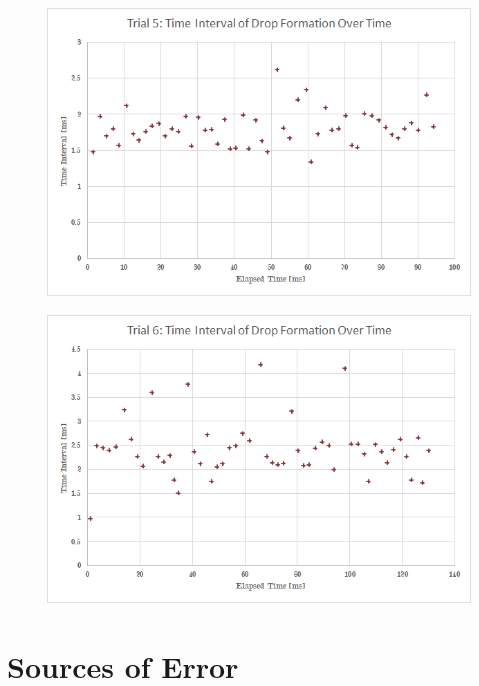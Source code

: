 \documentclass[a4paper]{article}
\begin{document}
\begin{figure}[H]
\centering
\begin{minipage}{.5\textwidth}
  \centering
  \includegraphics[width=\linewidth]{sink5.png}
  \label{fig:test1}
\end{minipage}%
\begin{minipage}{.5\textwidth}
  \centering
  \includegraphics[width=\linewidth]{sink6.png}
  \label{fig:test2}
\end{minipage}
\end{figure}

\section{Sources of Error}
\qq 
\end{document}
